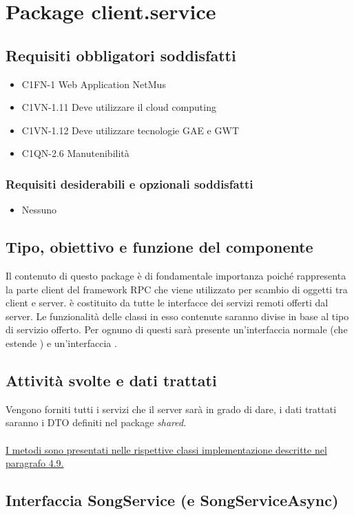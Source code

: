 \newpage
\section{Package client.service} %
\subsection*{Requisiti obbligatori soddisfatti}
\begin{itemize}
    \item C1FN-1 Web Application NetMus
    \item C1VN-1.11 Deve utilizzare il cloud computing
    \item C1VN-1.12 Deve utilizzare tecnologie GAE e GWT
    \item C1QN-2.6 Manutenibilit\`a
\end{itemize}
\subsubsection*{Requisiti desiderabili e opzionali soddisfatti}
\begin{itemize}
    \item Nessuno
\end{itemize}
\subsection*{Tipo, obiettivo e funzione del componente}
Il contenuto di questo package \`e di fondamentale importanza poich\'e
rappresenta la parte client del framework RPC che viene utilizzato per scambio
di oggetti tra client e server.  \`e costituito da tutte
le interfacce dei servizi remoti offerti dal server. Le funzionalit\`a delle
classi in esso contenute saranno divise in base al tipo di servizio offerto. Per
ognuno di questi sar\`a presente un'interfaccia normale (che estende
) e un'interfaccia .
\subsection*{Attivit\`a svolte e dati trattati}
Vengono forniti tutti i servizi che il server sar\`a in grado di dare, i dati
trattati saranno i DTO definiti nel package \emph{shared}.\\\\
\underline{I metodi sono presentati nelle rispettive classi implementazione
descritte nel paragrafo 4.9.}

\subsection{Interfaccia SongService (e SongServiceAsync)}
